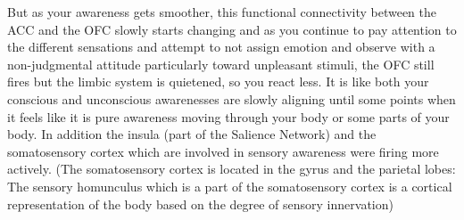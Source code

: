 \documentclass[twocolumn]{article}
\begin{document}
But as your awareness gets smoother, this functional connectivity between the ACC and the OFC slowly starts changing and as you continue to pay attention to the different sensations and attempt to not assign emotion and observe with a non-judgmental attitude particularly toward unpleasant stimuli, the OFC still fires but the limbic system is quietened, so you react less. It is like both your conscious and unconscious awarenesses are slowly aligning until some points when it feels like it is pure awareness moving through your body or some parts of your body. In addition the insula (part of the Salience Network) and the somatosensory cortex which are involved in sensory awareness were firing more actively.
(The somatosensory cortex is located in the gyrus and the parietal lobes: The sensory homunculus which is a part of the somatosensory cortex is a cortical representation of the body based on the degree of sensory innervation)
\end{document}
